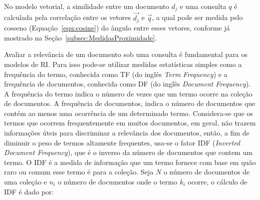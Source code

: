 No modelo vetorial, a similidade entre um documento $d_j$ e uma consulta $q$ é calculada pela correlação entre os vetores $\vec{d_j}$ e $\vec{q}$, a qual pode ser medida pelo cosseno (Equação~\ref{equ:cosine}) do ângulo entre esses vetores, conforme já mostrado na Seção~\ref{subsec:MedidasProximidade}. 





% 
% 
% 


Avaliar a relevância de um documento sob uma consulta é fundamental para os modelos de RI. Para isso pode-se utilizar medidas estatísticas simples como a frequência do termo, conhecida como TF (do inglês \textit{Term Frequency}) e a frequência de documentos, conhecida como DF (do inglês \textit{Document Frequency}). A frequência do termo indica o número de vezes que um termo ocorre na coleção de documentos. A frequência de documentos, indica o número de documentos que contém ao menos uma ocorrência de um determinado termo. Considera-se que os termos que ocorrem frequentemente em muitos documentos, em geral, não trazem informações úteis para discriminar a relevância dos documentos, então, a fim de diminuir o peso de termos altamente frequentes, usa-se o fator IDF (\textit{Inverted Document Frequency}), que é o inverso da número de documentos que contem um termo. O IDF é a medida de informação que um termo fornece com base em quão raro ou comum esse termo é para a coleção. Seja $N$ o número de documentos de uma coleção e $n_i$ o número de documentos onde o termo $k_i$ ocorre, o cálculo de IDF é dado por: 

